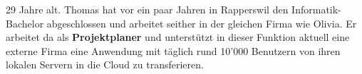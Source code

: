 \begin{description}
\begin{minipage}[t]{0.35\textwidth}
\begin{figure}[H]
						\caption[
						]
						{\label{Thomas Bucher}}
					\end{figure}
				\end{minipage}
				\begin{minipage}[t]{0.55\textwidth}
					29 Jahre alt.
					Thomas hat vor ein paar Jahren in Rapperswil den Informatik-Bachelor abgeschlossen und arbeitet seither in der gleichen Firma wie Olivia.
					Er arbeitet da als \textbf{Projektplaner} und unterstützt in dieser Funktion aktuell eine externe Firma eine Anwendung mit täglich rund 10'000 Benutzern von ihren lokalen Servern in die Cloud zu transferieren.
				\end{minipage}
		\end{description}
		
